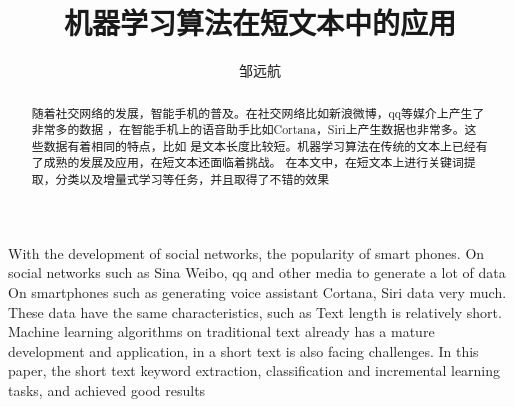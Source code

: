 \documentclass[master]{njuthesis}
\title{机器学习算法在短文本中的应用}
\author{邹远航}
\institute{南京大学}
\begin{document}

\makenlctitle
\maketitle
\makeenglishtitle


\frontmatter

\begin{abstract}
随着社交网络的发展，智能手机的普及。在社交网络比如新浪微博，qq等媒介上产生了非常多的数据
，在智能手机上的语音助手比如Cortana，Siri上产生数据也非常多。这些数据有着相同的特点，比如
是文本长度比较短。机器学习算法在传统的文本上已经有了成熟的发展及应用，在短文本还面临着挑战。
在本文中，在短文本上进行关键词提取，分类以及增量式学习等任务，并且取得了不错的效果
\end{abstract}

\begin{englishabstract}
\blindtext
With the development of social networks, the popularity of smart phones. On social networks such as Sina Weibo, qq and other media to generate a lot of data
On smartphones such as generating voice assistant Cortana, Siri data very much. These data have the same characteristics, such as
Text length is relatively short. Machine learning algorithms on traditional text already has a mature development and application, in a short text is also facing challenges.
In this paper, the short text keyword extraction, classification and incremental learning tasks, and achieved good results
\end{englishabstract}
\end{document}
